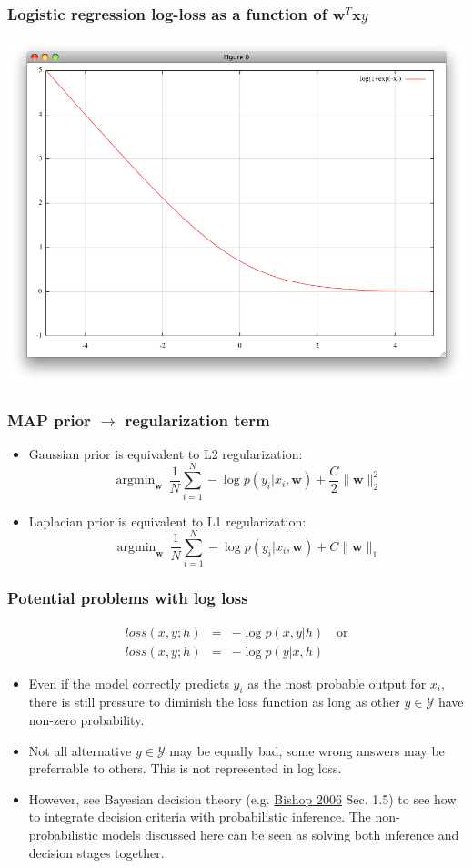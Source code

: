 \documentclass[ignorenonframetext,plain]{beamer}
\DeclareMathOperator*{\argmin}{argmin}
\newcommand{\loss}{\mathit{loss}}
\renewcommand{\vec}{\mathbf}
\begin{document}
\begin{frame}\frametitle{Logistic regression log-loss as a function of $\vec{w}^T\vec{x}y$}
\includegraphics[width=\textwidth]{images/log-loss.png}
\end{frame}

\begin{frame}\frametitle{MAP prior $\rightarrow$ regularization term}
\begin{itemize}
\item Gaussian prior is equivalent to L2 regularization: \[
  \argmin_\vec{w}\, \frac{1}{N} \sum_{i=1}^N -\log p(y_i|x_i,\vec{w}) + \frac{C}{2}\|\vec{w}\|_2^2
\]
\item Laplacian prior is equivalent to L1 regularization: \[
  \argmin_\vec{w}\, \frac{1}{N} \sum_{i=1}^N -\log p(y_i|x_i,\vec{w}) + C \|\vec{w}\|_1
\]
\end{itemize}
\end{frame}

\begin{frame}\frametitle{Potential problems with log loss}
\begin{eqnarray*}
\loss(x, y; h) &=& -\log p(x, y | h)\quad\text{or}\\
\loss(x, y; h) &=& -\log p(y | x, h)
\end{eqnarray*}
\begin{itemize}
\item Even if the model correctly predicts $y_i$ as the most probable
  output for $x_i$, there is still pressure to diminish the loss
  function as long as other $y\in\mathcal{Y}$ have non-zero
  probability.
\item Not all alternative $y\in\mathcal{Y}$ may be equally bad, some
  wrong answers may be preferrable to others.  This is not represented
  in log loss.
\item However, see Bayesian decision theory
  (e.g. \href{http://research.microsoft.com/en-us/um/people/cmbishop/prml}{Bishop
  2006} Sec. 1.5) to see how to integrate decision criteria with
  probabilistic inference.  The non-probabilistic models discussed
  here can be seen as solving both inference and decision stages
  together.
\end{itemize}
\end{frame}
\end{document}
